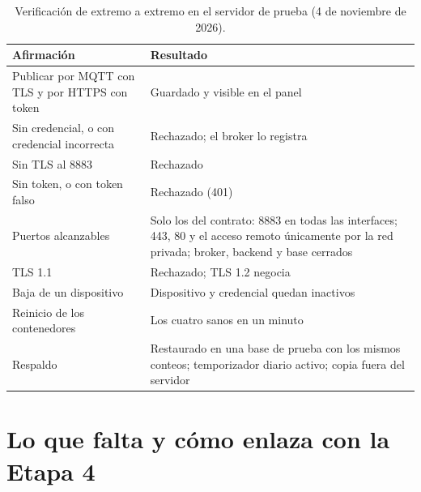 \begin{table}[H]
\centering\footnotesize
\begin{tablaseg}
\begin{tabular}{@{}L{5.2cm}L{7.8cm}@{}}
\toprule
\textbf{Afirmación} & \textbf{Resultado} \\
\midrule
Publicar por MQTT con TLS y por HTTPS con token & Guardado y visible en el panel \\
Sin credencial, o con credencial incorrecta & Rechazado; el broker lo registra \\
Sin TLS al 8883 & Rechazado \\
Sin token, o con token falso & Rechazado (401) \\
Puertos alcanzables & Solo los del contrato: 8883 en todas las interfaces; 443, 80 y el acceso remoto únicamente por la red privada; broker, backend y base cerrados \\
TLS 1.1 & Rechazado; TLS 1.2 negocia \\
Baja de un dispositivo & Dispositivo y credencial quedan inactivos \\
Reinicio de los contenedores & Los cuatro sanos en un minuto \\
Respaldo & Restaurado en una base de prueba con los mismos conteos; temporizador diario activo; copia fuera del servidor \\
\bottomrule
\end{tabular}
\end{tablaseg}
\caption[Verificación en el servidor de prueba]{Verificación de extremo a extremo en el servidor de prueba (4 de noviembre de 2026).}
\label{tab:servidor-verificacion}
\end{table}

\section{Lo que falta y cómo enlaza con la Etapa 4}

